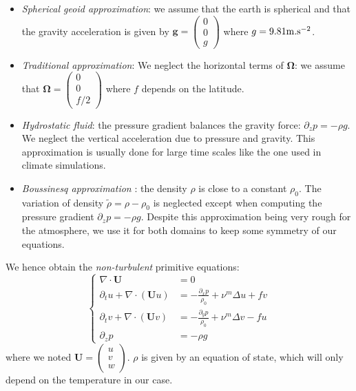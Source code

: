 \begin{itemize}
\item \textit{Spherical geoid approximation}:
we assume that the earth is spherical and that the
gravity acceleration is given by
$\mathbf{g} =\begin{pmatrix}
0\\ 0 \\ g
\end{pmatrix}$ where $g=9.81 {\rm m}.{\rm s}^{-2}$.
\item \textit{Traditional approximation}:
We neglect the horizontal terms of
$\mathbf{\Omega}$: we assume that
$\mathbf{\Omega} =\begin{pmatrix}
0\\ 0 \\ f/2
\end{pmatrix}$ where $f$ depends on the latitude.
\item \textit{Hydrostatic fluid}:
the pressure gradient balances the gravity force:
$\partial_z p = -\rho g$. We neglect the vertical
acceleration due to pressure and gravity.
This approximation is usually done for large time
scales like the one used in climate simulations.
\item \textit{Boussinesq approximation}
\citep{boussinesq_theorie_1903}:
the density $\rho$ is close to a constant $\rho_0$.
The variation of density $\widetilde{\rho} =
\rho - \rho_0$ is neglected except when computing
the pressure gradient $\partial_z p = - \rho g$.
Despite this approximation being very rough
for the atmosphere, we use it for both domains
to keep some symmetry of our equations.
\end{itemize}
We hence obtain the \textit{non-turbulent}
primitive equations:
\begin{equation}
	\label{eq:airseaSCM_nonTurbulentPrimitiveEq}
\begin{cases}
	\nabla \cdot \mathbf{U} &= 0 \\
	\partial_t u + \nabla \cdot (\mathbf{U} u) &=
	- \frac{\partial_x p}{\rho_0} + \nu^m \Delta u
	+ f v \\
	\partial_t v + \nabla \cdot (\mathbf{U} v) &=
	- \frac{\partial_y p}{\rho_0} + \nu^m \Delta v
	- f u \\
	\partial_z p &= -\rho g
\end{cases}
\end{equation}
where we noted $\mathbf{U} = \begin{pmatrix}u\\v\\w\end{pmatrix}$.
$\rho$ is given by an equation of state, which will only depend on
the temperature in our case. 
